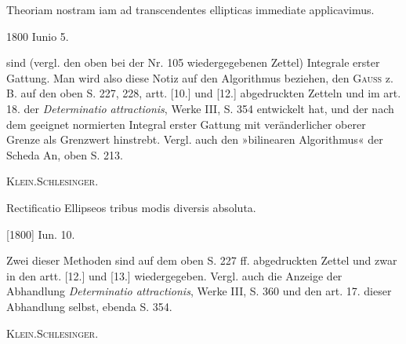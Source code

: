 \indent Theoriam nostram iam ad transcendentes ellipticas immediate applicavimus.
\par\noindent\hfill1800 Iunio 5.

\medskip\begingroup\small
\indent{} sind (vergl. den oben bei der Nr. 105 wiedergegebenen Zettel) Integrale erster Gattung. Man wird also diese Notiz auf den Algorithmus beziehen, den \textsc{Gauss} z. B. auf den oben S. 227, 228, artt. [10.] und [12.] abgedruckten Zetteln und im art. 18. der \textit{Determinatio attractionis}, Werke III, S. 354 entwickelt hat, und der nach dem geeignet normierten Integral erster Gattung mit veränderlicher oberer Grenze als Grenzwert hinstrebt. Vergl. auch den »bilinearen Algorithmus« der Scheda An, oben S. 213.
\par\noindent\hfill\textsc{Klein.\quad Schlesinger.}
\par\endgroup

\indent Rectificatio Ellipseos tribus modis diversis absoluta.
\par\noindent\hfill[1800] Iun. 10.

\medskip\begingroup\small
\indent Zwei dieser Methoden sind auf dem oben S. 227 ff. abgedruckten Zettel und zwar in den artt. [12.] und [13.] wiedergegeben. Vergl. auch die Anzeige der Abhandlung \textit{Determinatio attractionis}, Werke III, S. 360 und den art. 17. dieser Abhandlung selbst, ebenda S. 354.
\par\noindent\hfill\textsc{Klein.\quad Schlesinger.}
\par\endgroup
